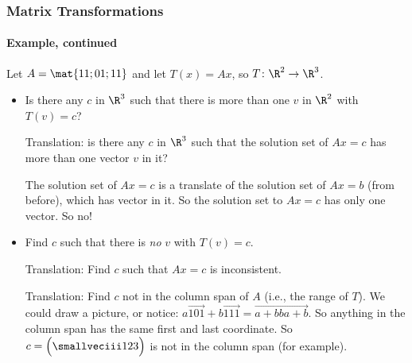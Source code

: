 \begin{frame}
\frametitle{Matrix Transformations}
\framesubtitle{Example, continued}

\def\A{\mat{1 1; 0 1; 1 1}}
Let $A = \A$ and let $T(x) = Ax$, so $T\colon\R^2\to\R^3$.

\begin{itemize}
\pause
\item Is there any $c$ in $\R^3$ such that there is more than one $v$ in $\R^2$ with
  $T(v) = c$? 

  \pause\smallskip
  \alert{Translation:} is there any $c$ in $\R^3$ such that the solution set of
  $Ax = c$ has more than one vector $v$ in it?

  \pause\smallskip
  The solution set of $Ax = c$ is a translate of the solution set of
  $Ax = b$ (from before), which has  vector in it.
  \pause[6]%
  So the solution set to $Ax = c$ has only one vector.
  \pause
  So no!

  \pause\medskip
\item Find $c$ such that there is \emph{no} $v$ with $T(v) = c$.

  \pause\smallskip
  \alert{Translation:} Find $c$ such that $Ax = c$ is inconsistent.

  \pause\smallskip
  \alert{Translation:} Find $c$ not in the column span of $A$ (i.e., the range
    of $T$).
    \pause
    We could draw a picture, or notice:
    $a\vec{1 0 1} + b\vec{1 1 1} = \vec{a+b b a+b}$.
    \pause
    So anything in the column span has the same first and last coordinate.
    \pause
    So $c = \Bigl(\smallveciii123\Bigr)$ is not in the column span (for example).

\end{itemize}

\end{frame}



